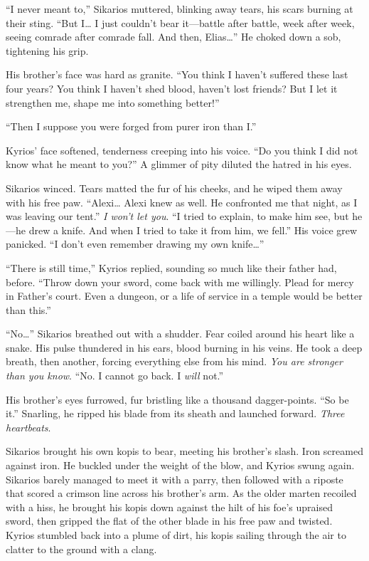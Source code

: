 ``I never meant to,'' Sikarios muttered, blinking away tears, his scars burning at their sting. ``But I\ldots{} I just couldn't bear it---battle after battle, week after week, seeing comrade after comrade fall. And then, Elias\ldots'' He choked down a sob, tightening his grip.

His brother's face was hard as granite. ``You think I haven't suffered these last four years? You think I haven't shed blood, haven't lost friends? But I let it strengthen me, shape me into something better!''

``Then I suppose you were forged from purer iron than I.''

Kyrios' face softened, tenderness creeping into his voice. ``Do you think I did not know what he meant to you?'' A glimmer of pity diluted the hatred in his eyes.

Sikarios winced. Tears matted the fur of his cheeks, and he wiped them away with his free paw. ``Alexi\ldots{} Alexi knew as well. He confronted me that night, as I was leaving our tent.'' \emph{I won't let you}. ``I tried to explain, to make him see, but he---he drew a knife. And when I tried to take it from him, we fell.'' His voice grew panicked. ``I don't even remember drawing my own knife\ldots''

``There is still time,'' Kyrios replied, sounding so much like their father had, before. ``Throw down your sword, come back with me willingly. Plead for mercy in Father's court. Even a dungeon, or a life of service in a temple would be better than this.''

``No\ldots'' Sikarios breathed out with a shudder. Fear coiled around his heart like a snake. His pulse thundered in his ears, blood burning in his veins. He took a deep breath, then another, forcing everything else from his mind. \emph{You are stronger than you know}. ``No. I cannot go back. I \emph{will} not.''

His brother's eyes furrowed, fur bristling like a thousand dagger-points. ``So be it.'' Snarling, he ripped his blade from its sheath and launched forward. \emph{Three heartbeats}.

Sikarios brought his own kopis to bear, meeting his brother's slash. Iron screamed against iron. He buckled under the weight of the blow, and Kyrios swung again. Sikarios barely managed to meet it with a parry, then followed with a riposte that scored a crimson line across his brother's arm. As the older marten recoiled with a hiss, he brought his kopis down against the hilt of his foe's upraised sword, then gripped the flat of the other blade in his free paw and twisted. Kyrios stumbled back into a plume of dirt, his kopis sailing through the air to clatter to the ground with a clang.

